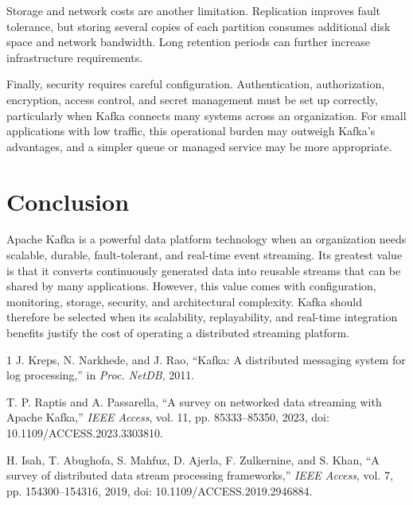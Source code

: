 \documentclass[10pt,a4paper,twocolumn]{article}
\begin{document}
Storage and network costs are another limitation. Replication improves fault tolerance, but storing several copies of each partition consumes additional disk space and network bandwidth. Long retention periods can further increase infrastructure requirements.

Finally, security requires careful configuration. Authentication, authorization, encryption, access control, and secret management must be set up correctly, particularly when Kafka connects many systems across an organization. For small applications with low traffic, this operational burden may outweigh Kafka's advantages, and a simpler queue or managed service may be more appropriate.

\section{Conclusion}

Apache Kafka is a powerful data platform technology when an organization needs scalable, durable, fault-tolerant, and real-time event streaming. Its greatest value is that it converts continuously generated data into reusable streams that can be shared by many applications. However, this value comes with configuration, monitoring, storage, security, and architectural complexity. Kafka should therefore be selected when its scalability, replayability, and real-time integration benefits justify the cost of operating a distributed streaming platform.

{\small
\begin{thebibliography}{1}
J. Kreps, N. Narkhede, and J. Rao, ``Kafka: A distributed messaging system for log processing,'' in \textit{Proc. NetDB}, 2011.

T. P. Raptis and A. Passarella, ``A survey on networked data streaming with Apache Kafka,'' \textit{IEEE Access}, vol. 11, pp. 85333--85350, 2023, doi: 10.1109/ACCESS.2023.3303810.

H. Isah, T. Abughofa, S. Mahfuz, D. Ajerla, F. Zulkernine, and S. Khan, ``A survey of distributed data stream processing frameworks,'' \textit{IEEE Access}, vol. 7, pp. 154300--154316, 2019, doi: 10.1109/ACCESS.2019.2946884.
\end{thebibliography}
}
\end{document}
